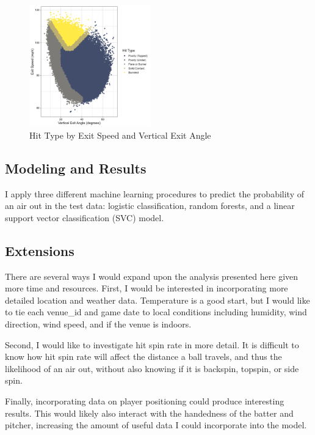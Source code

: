 \begin{figure}[htb]
  \includegraphics[width = 0.47\textwidth]{../../output/figs/barreled.png}
  \caption{Hit Type by Exit Speed and Vertical Exit Angle}
  \label{fig:barreled}
\end{figure}

\subsection{Modeling and Results}
\label{subsec:model}

I apply three different machine learning procedures to predict the probability of an air out in the test data: logistic classification, random forests, and a linear support vector classification (SVC) model.

\subsection{Extensions}
\label{subsec:results}

There are several ways I would expand upon the analysis presented here given more time and resources. First, I would be interested in incorporating more detailed location and weather data. Temperature is a good start, but I would like to tie each venue\_id and game date to local conditions including humidity, wind direction, wind speed, and if the venue is indoors.

Second, I would like to investigate hit spin rate in more detail. It is difficult to know how hit spin rate will affect the distance a ball travels, and thus the likelihood of an air out, without also knowing if it is backspin, topspin, or side spin.

Finally, incorporating data on player positioning could produce interesting results. This would likely also interact with the handedness of the batter and pitcher, increasing the amount of useful data I could incorporate into the model.
